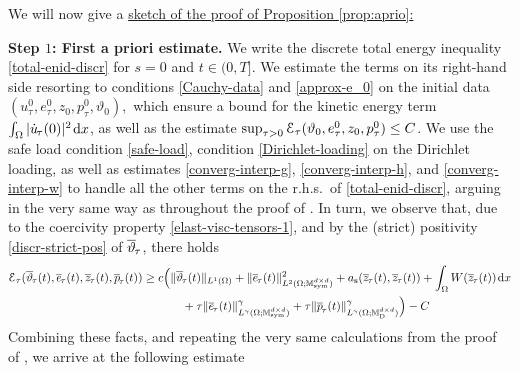 \documentclass[a4paper,10pt,reqno]{amsart}
\numberwithin{equation}{section}
\newcommand{\bbM}{\mathbb{M}}
\numberwithin{equation}{section}
\def\dd{\;\!\mathrm{d}} %
\newcommand{\teta}{\vartheta}
\newcommand{\piecewiseConstant}[2]{\overline{#1}_{\kern-1pt#2}}
\newcommand{\pwc}{\piecewiseConstant}
\newcommand{\piecewiseLinear}[2]{{#1}_{\kern-1pt#2}}
\newcommand{\pwl}{\piecewiseLinear}
\newcommand{\mt}{\bbM}
\newcommand{\sym}{\mathrm{sym}}
\newcommand{\dev}{\mathrm{D}}
\newcommand{\ass}{a_{\mathrm{s}}}
\begin{document}
  \noindent
  We will now give a \underline{sketch of the proof of Proposition \ref{prop:aprio}:}
  \par
  \noindent
  \textbf{Step $1$: First a priori estimate.} We write the discrete total energy inequality \eqref{total-enid-discr} for $s=0$ and $t\in (0,T]$. 
  We estimate 
    the terms on its right-hand side resorting to conditions \eqref{Cauchy-data}
and  \eqref{approx-e_0}
on the initial data $(u_\tau^0,e_\tau^0, z_0,p_\tau^0,\teta_0), $ which ensure a bound for the kinetic energy term $\int_\Omega |\pwl{\dot u}\tau(0)|^2 \dd x $, as well as the estimate
$\sup_{\tau>0} \calE_\tau(\teta_0,e_\tau^0, z_0,p_\tau^0) \leq C$. 
We use  the safe load condition \eqref{safe-load}, condition \eqref{Dirichlet-loading} on the Dirichlet loading,  as well as estimates \eqref{converg-interp-g}, \eqref{converg-interp-h}, and \eqref{converg-interp-w} to handle all the other terms on the r.h.s.\ of \eqref{total-enid-discr},
arguing in the very same way as throughout the proof of \cite[Prop.\ 4.3]{Rossi2016}.
In turn, we observe that, due to the coercivity property \eqref{elast-visc-tensors-1}, %
 and by 
the (strict) positivity \eqref{discr-strict-pos}  of $\pwc \teta\tau$, there holds
\[
\begin{aligned}
\calE_\tau (\pwc \teta\tau(t), \pwc e\tau(t), \pwc z\tau(t), \pwc p \tau(t)) \geq c \Big( &  \| \pwc \teta\tau(t)\|_{L^1(\Omega)} + \| \pwc e\tau(t)\|_{L^2(\Omega;\mt_\sym^{d\times d})}^2 
+ \ass (\pwc z \tau(t), \pwc z\tau(t)) + \int_\Omega W(\pwc z \tau(t)) \dd x 
\\
& \quad 
+\tau  \| \pwc e\tau(t)\|_{L^\gamma(\Omega;\mt_\sym^{d\times d})}^\gamma +\tau  \| \pwc p\tau(t)\|_{L^\gamma(\Omega;\mt_\dev^{d\times d})}^\gamma \Big) -C
\end{aligned}
\]
Combining these facts, and repeating the very same calculations from the proof of  \cite[Prop.\ 4.3]{Rossi2016}, we arrive at the following estimate
\end{document}
